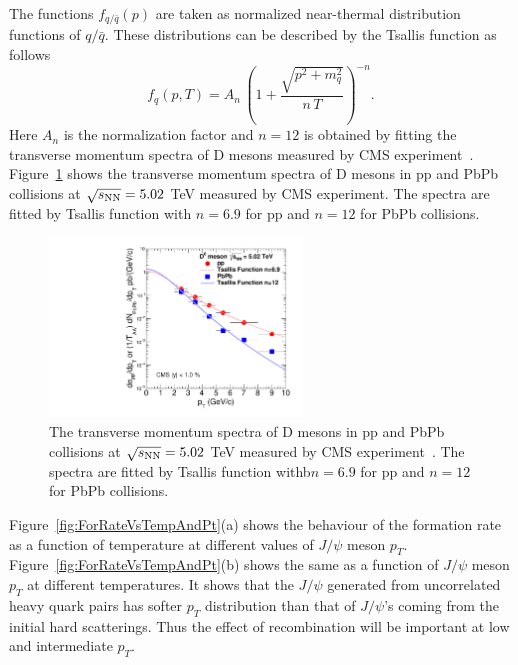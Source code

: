 \documentclass[12pt,a4paper,final]{iopart} %
\newcommand{\Jpsi}{J/\psi}
\newcommand{\pT}{p_{T}}
\begin{document}
The functions $f_{q/\bar{q}}(p)$ are taken as normalized near-thermal distribution functions
of $q/\bar{q}$. These distributions can be described by the Tsallis
function as follows 
\begin{equation}
f_{q} (p,T) = A_{n}\,\left( 1+\frac{ \sqrt{p^2+m_q^2} }{n \,T} \right)^{-n}.
\end{equation}
Here $A_n$ is the normalization factor and $n=12$ is obtained by fitting the
transverse momentum spectra of D mesons measured by CMS experiment~\cite{Sirunyan:2017xss}. Figure~\ref{fig:Figure3_Tsallis} shows the
transverse momentum spectra of D mesons in pp and PbPb collisions
at $\sqrt{s_{\rm NN}}=5.02$ TeV measured by CMS experiment. The spectra are fitted
by Tsallis function with $n=6.9$ for pp and $n=12$ for PbPb collisions.
\begin{figure}
  \includegraphics[width=0.60\textwidth]{Figure3_DMeson_502TeV.pdf}
  \caption{The transverse momentum spectra of D mesons in pp and PbPb collisions
    at $\sqrt{s_{\rm NN}}=5.02$ TeV measured by CMS experiment~\cite{Sirunyan:2017xss}.
    The spectra are fitted
    by Tsallis function withb$n=6.9$ for pp and $n=12$ for PbPb collisions.
  }
  \label{fig:Figure3_Tsallis}
\end{figure}



Figure~\ref{fig:ForRateVsTempAndPt}(a) shows the behaviour of the formation rate as a function 
of temperature at different values of $\Jpsi$ meson $\pT$.
Figure~\ref{fig:ForRateVsTempAndPt}(b) shows the same as a function
of $\Jpsi$ meson $p_T$ at different temperatures.
It shows that the $\Jpsi$ generated from uncorrelated heavy quark pairs has 
softer $p_{T}$ distribution than that of $\Jpsi$'s coming from the initial hard scatterings.
Thus the effect of recombination will be important at low and intermediate $p_T$.
\end{document}
